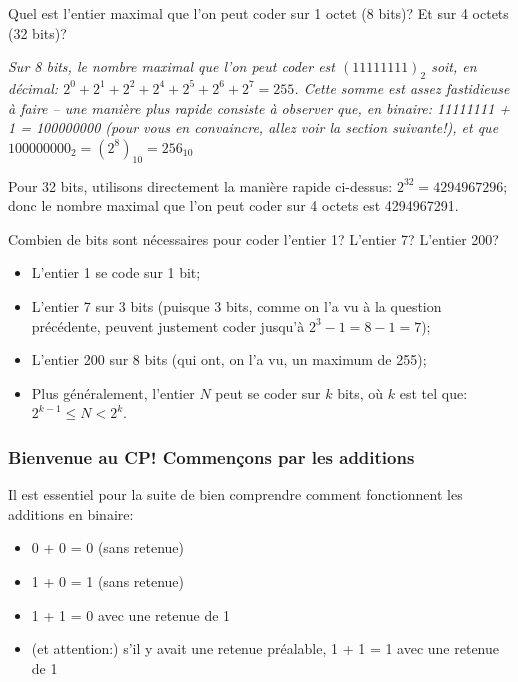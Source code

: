 \documentclass[12pt]{article}
\newenvironment{MaReponse}
		{\begin{greyedtextbox}\itshape} %
		{\end{greyedtextbox}}            %
\begin{document}
	 \begin{MonExo}
	 	Quel est l'entier maximal que l'on peut coder sur 1 octet (8 bits)? Et sur 4 octets (32 bits)?
	 \end{MonExo}
	\begin{MaReponse}
		Sur 8 bits, le nombre maximal que l'on peut coder est $(11111111)_2$ soit, en décimal: $2^0 + 2^1 + 2^2 + 2^4 + 2^5 + 2^6 + 2^7=255$. Cette somme est assez fastidieuse à faire -- une manière plus rapide consiste à observer que, en binaire: 11111111 + 1 = 100000000 (pour vous en convaincre, allez voir la section suivante!), et que $100000000_2 = (2^8)_{10} = 256_{10}$
		
		Pour 32 bits, utilisons directement la manière rapide ci-dessus: $2^{32}=4294967296$; donc le nombre maximal que l'on peut coder sur 4 octets est 4294967291.
	\end{MaReponse}
	 
	 \begin{MonExo}[et à l'inverse...]
	 	Combien de bits sont nécessaires pour coder l'entier 1? L'entier 7? L'entier 200?
	 \end{MonExo}
	 \begin{MaReponse}
	 	\begin{itemize}
	 		\item L'entier 1 se code sur 1 bit;
	 		\item L'entier 7 sur 3 bits (puisque 3 bits, comme on l'a vu à la question précédente, peuvent justement coder jusqu'à $2^3 - 1 = 8 - 1 = 7$);
	 		\item L'entier 200 sur 8 bits (qui ont, on l'a vu, un maximum de 255);
	 		\item Plus généralement, l'entier $N$ peut se coder sur $k$ bits, où $k$ est tel que: $2^{k-1} \le N < 2^k$.
	 	\end{itemize}
	 	 
	 \end{MaReponse}
	 
	 \subsubsection*{Bienvenue au CP! Commençons par les additions}
	 Il est essentiel pour la suite de bien comprendre comment fonctionnent les additions en binaire:
	 \begin{itemize}
	 	\item 0 + 0 = 0 (sans retenue)
	 	\item 1 + 0 = 1 (sans retenue)
	 	\item 1 + 1 = 0 avec une retenue de 1
	 	\item (et attention:) s'il y avait une retenue préalable, 1 + 1 = 1 avec une retenue de 1
	 \end{itemize}
	 
\end{document}
